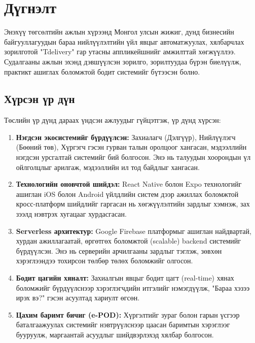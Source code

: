 
\section{Дүгнэлт}

Энэхүү төгсөлтийн ажлын хүрээнд Монгол улсын жижиг, дунд бизнесийн байгууллагуудын бараа нийлүүлэлтийн үйл явцыг автоматжуулах, хялбарчлах зорилготой "Tdelivery" гар утасны аппликейшнийг амжилттай хөгжүүллээ. Судалгааны ажлын эхэнд дэвшүүлсэн зорилго, зорилтуудаа бүрэн биелүүлж, практикт ашиглах боломжтой бодит системийг бүтээсэн болно.

\subsection{Хүрсэн үр дүн}
Төслийн үр дүнд дараах үндсэн ажлуудыг гүйцэтгэж, үр дүнд хүрсэн:

\begin{enumerate}
    \item \textbf{Нэгдсэн экосистемийг бүрдүүлсэн:} Захиалагч (Дэлгүүр), Нийлүүлэгч (Бөөний төв), Хүргэгч гэсэн гурван талын оролцоог хангасан, мэдээллийн нэгдсэн урсгалтай системийг бий болгосон. Энэ нь талуудын хоорондын үл ойлголцлыг арилгаж, мэдээллийн ил тод байдлыг хангасан.
    \item \textbf{Технологийн оновчтой шийдэл:} React Native болон Expo технологийг ашиглан iOS болон Android үйлдлийн систем дээр ажиллах боломжтой кросс-платформ шийдлийг гаргасан нь хөгжүүлэлтийн зардлыг хэмнэж, зах зээлд нэвтрэх хугацааг хурдасгасан.
    \item \textbf{Serverless архитектур:} Google Firebase платформыг ашиглан найдвартай, хурдан ажиллагаатай, өргөтгөх боломжтой (scalable) backend системийг бүрдүүлсэн. Энэ нь серверийн арчилгааны зардлыг тэглэж, зөвхөн хэрэглээндээ тохирсон төлбөр төлөх боломжийг олгосон.
    \item \textbf{Бодит цагийн хяналт:} Захиалгын явцыг бодит цагт (real-time) хянах боломжийг бүрдүүлснээр хэрэглэгчдийн итгэлийг нэмэгдүүлж, "Бараа хэзээ ирэх вэ?" гэсэн асуултад хариулт өгсөн.
    \item \textbf{Цахим баримт бичиг (e-POD):} Хүргэлтийг зураг болон гарын үсгээр баталгаажуулах системийг нэвтрүүлснээр цаасан баримтын хэрэглээг бууруулж, маргаантай асуудлыг шийдвэрлэхэд хялбар болгосон.
\end{enumerate}

